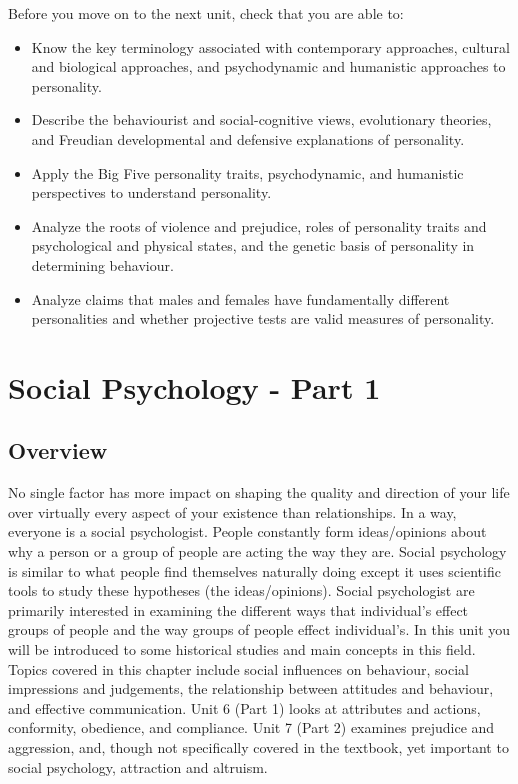 \documentclass[
]{book}
\providecommand{\tightlist}{%
  \setlength{\itemsep}{0pt}\setlength{\parskip}{0pt}}
\begin{document}
\begin{progress}
Before you move on to the next unit, check that you are able to:

\begin{itemize}
\tightlist
\item
  Know the key terminology associated with contemporary approaches, cultural and biological approaches, and psychodynamic and humanistic approaches to personality.\\
\item
  Describe the behaviourist and social-cognitive views, evolutionary theories, and Freudian developmental and defensive explanations of personality.\\
\item
  Apply the Big Five personality traits, psychodynamic, and humanistic perspectives to understand personality.\\
\item
  Analyze the roots of violence and prejudice, roles of personality traits and psychological and physical states, and the genetic basis of personality in determining behaviour.\\
\item
  Analyze claims that males and females have fundamentally different personalities and whether projective tests are valid measures of personality.
\end{itemize}
\end{progress}

\hypertarget{social-psychology---part-1}{%
\chapter{Social Psychology - Part 1}\label{social-psychology---part-1}}

\hypertarget{overview-4}{%
\section*{Overview}\label{overview-4}}

No single factor has more impact on shaping the quality and direction of your life over virtually every aspect of your existence than relationships. In a way, everyone is a social psychologist. People constantly form ideas/opinions about why a person or a group of people are acting the way they are. Social psychology is similar to what people find themselves naturally doing except it uses scientific tools to study these hypotheses (the ideas/opinions). Social psychologist are primarily interested in examining the different ways that individual's effect groups of people and the way groups of people effect individual's. In this unit you will be introduced to some historical studies and main concepts in this field. Topics covered in this chapter include social influences on behaviour, social impressions and judgements, the relationship between attitudes and behaviour, and effective communication. Unit 6 (Part 1) looks at attributes and actions, conformity, obedience, and compliance. Unit 7 (Part 2) examines prejudice and aggression, and, though not specifically covered in the textbook, yet important to social psychology, attraction and altruism.
\end{document}
